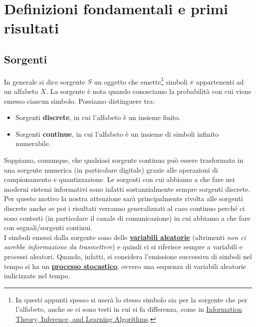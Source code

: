 \section{Definizioni fondamentali e primi risultati} \label{sec:def}

\subsection{Sorgenti}
In generale si dice sorgente $S$ un oggetto che emette\footnote{In questi appunti spesso si user\`a lo stesso simbolo sia per la sorgente che per l'alfabeto, anche se ci sono testi in cui si fa differenza, come in \href{http://www.inference.org.uk/mackay/itprnn/book.html}{Information Theory, Inference, and Learning Algorithms}.} simboli $x$ appartenenti ad un alfabeto $X$. La sorgente è nota quando conosciamo la probabilità con cui viene emesso ciascun simbolo. Possiamo distinguere tra:
\begin{itemize}
    \item Sorgenti \textbf{discrete}, in cui l'alfabeto \`e un insieme finito.
    \item Sorgenti \textbf{continue}, in cui l'alfabeto \`e un insieme di simboli infinito numerabile.
\end{itemize}

Sappiamo, comunque, che qualsiasi sorgente continua può essere trasformata in una sorgente numerica (in
particolare digitale) grazie alle operazioni di campionamento e quantizzazione. Le sorgenti con cui abbiamo a che fare nei moderni sistemi informativi sono infatti sostanzialmente sempre sorgenti discrete. Per questo motivo la nostra attenzione sarà principalmente rivolta alle sorgenti discrete anche se poi i risultati verranno generalizzati al caso continuo perché ci sono contesti (in particolare il canale di comunicazione) in cui abbiamo a che fare con segnali/sorgenti continui. \\
I simboli emessi dalla sorgente sono delle \hyperref[sec:prob]{\textbf{variabili aleatorie}} (altrimenti \textit{non ci sarebbe informazione da
trasmettere}) e quindi ci si riferisce sempre a variabili e processi aleatori. Quando, infatti, si considera l’emissione successiva di simboli nel tempo si ha un \hyperref[sec:stoc]{\textbf{processo stocastico}}, ovvero una sequenza di variabili aleatorie indicizzate nel tempo.

